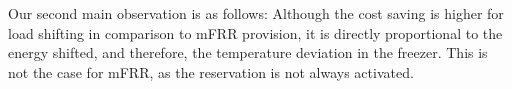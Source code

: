 Our second main observation is as follows: Although the cost saving is higher for load shifting in comparison to mFRR  provision, it is directly proportional to the energy shifted, and therefore, the temperature deviation in the freezer. This is not the case for mFRR, as the reservation is not always activated. 












